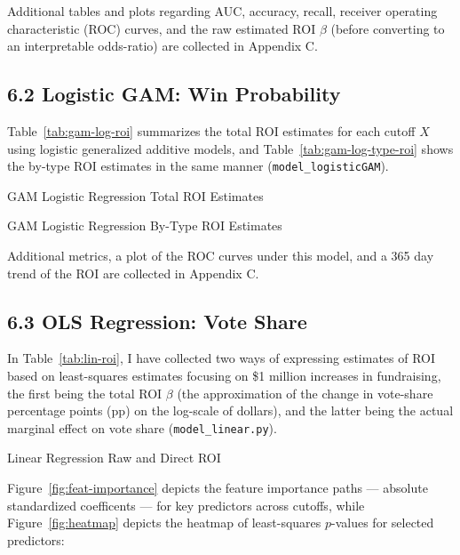 Additional tables and plots regarding AUC, accuracy, recall, receiver operating characteristic (ROC) curves, and the raw estimated ROI $\beta$ (before converting to an interpretable odds-ratio) are collected in Appendix C.

\subsection*{6.2 Logistic GAM: Win Probability}

Table~\ref{tab:gam-log-roi} summarizes the total ROI estimates for each cutoff $X$ using logistic generalized additive models, and Table~\ref{tab:gam-log-type-roi} shows the by-type ROI estimates in the same manner (\texttt{model\_logisticGAM}). 

\begin{table}[H]
	\centering
	
	\caption{GAM Logistic Regression Total ROI Estimates}
	\label{tab:gam-log-roi}
\end{table}

\begin{table}[ht]
	\centering
	
	\caption{GAM Logistic Regression By-Type ROI Estimates}
	\label{tab:gam-log-type-roi}
\end{table}

Additional metrics, a plot of the ROC curves under this model, and a 365 day trend of the ROI are collected in Appendix C. 

\subsection*{6.3 OLS Regression: Vote Share}

In Table~\ref{tab:lin-roi}, I have collected two ways of expressing estimates of ROI based on least-squares estimates focusing on \$1 million increases in fundraising, the first being the total ROI $\beta$ (the approximation of the change in vote-share percentage points (pp) on the log-scale of dollars), and the latter being the actual marginal effect on vote share (\texttt{model\_linear.py}).

\begin{table}[!t]
	\centering
	
	\caption{Linear Regression Raw and Direct ROI}
	\label{tab:lin-roi}
\end{table}

Figure~\ref{fig:feat-importance} depicts the feature importance paths --- absolute standardized coefficents --- for key predictors across cutoffs, while Figure~\ref{fig:heatmap} depicts the heatmap of least-squares $p$-values for selected predictors:

